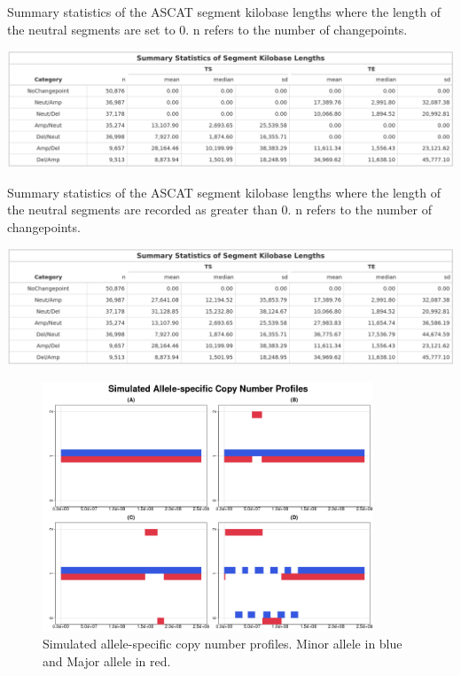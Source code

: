 \begin{table}[H]
\vspace{0.2cm}
  \caption[Summary statistics of the ASCAT segment kilobase lengths where the length of the neutral segments are set to 0.]{Summary statistics of the ASCAT segment kilobase lengths where the length of the neutral segments are set to 0. n refers to the number of changepoints.}
  \label{tbl:excel-table1}
  \includegraphics[width=\linewidth]{../tables/Chapter_5/ASCAT_Summary_Table_All_Zero.png}
\end{table}

\begin{table}[H]
  \caption[Summary statistics of the ASCAT segment kilobase lengths where the length of the neutral segments are recorded as greater than 0.]{Summary statistics of the ASCAT segment kilobase lengths where the length of the neutral segments are recorded as greater than 0. n refers to the number of changepoints.}
  \label{tbl:excel-table2}
  \includegraphics[width=\linewidth]{../tables/Chapter_5/ASCAT_Summary_Table_All_NoZero.png}
\end{table}

\begin{figure}[!ht]
\center
\includegraphics[width = 0.88\textwidth]{../figures/Chapter_5/Example_ASCAT_Scen.png}
\caption[Simulated allele-specific copy number profiles]{Simulated allele-specific copy number profiles. Minor allele in blue and Major allele in red.}
\label{fig:MockASCAT}
\end{figure}
\FloatBarrier 

